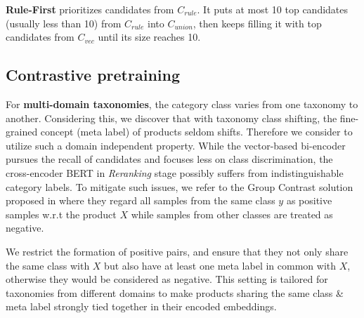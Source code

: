 \noindent\textbf{Rule-First} prioritizes candidates from $C_{rule}$. It puts at most 10 top candidates (usually less than 10) from $C_{rule}$ into $C_{union}$, then keeps filling it with top candidates from $C_{vec}$ 
until its size reaches 10.


\subsection{Contrastive pretraining}
For \textbf{multi-domain taxonomies}, the category class varies from one taxonomy to another. Considering this, we discover that with taxonomy class shifting, the fine-grained concept (meta label) of products seldom shifts. Therefore we consider to utilize such a domain independent property.
While the vector-based bi-encoder pursues the recall of candidates and focuses less on class discrimination, the cross-encoder BERT in \textit{Reranking} stage possibly suffers from indistinguishable category labels. To mitigate such issues, we refer to the Group Contrast solution proposed in \cite{wang2021self} where they regard all samples from the same class $y$ as positive samples w.r.t the product $X$ while samples from other classes are treated as negative. 

 We restrict the formation of positive pairs, and ensure that they not only share the same class with $X$ but also have at least one meta label in common with $X$, otherwise they would be considered as negative. This setting is tailored for taxonomies from different domains to make products sharing the same class \& meta label strongly tied together in their encoded embeddings. 

